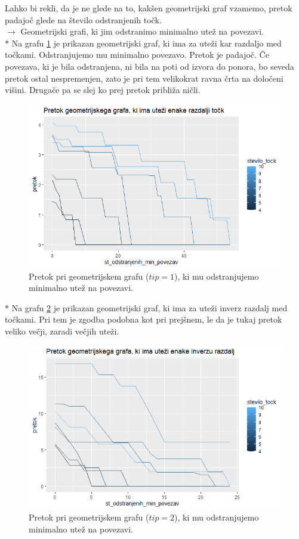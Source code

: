 \documentclass[a4paper]{article}
\begin{document}
Lahko bi rekli, da je ne glede na to, kakšen geometrijski graf vzamemo, pretok padajoč glede na število odstranjenih točk. \\

$\rightarrow $  Geometrijski grafi, ki jim odstranimo minimalno utež na povezavi. \\

$\ast$ Na grafu \ref{fig9} je prikazan geometrijski graf, ki ima za uteži kar razdaljo med točkami. Odstranjujemo mu minimalno povezavo. Pretok je padajoč. Če povezava, ki je bila odstranjena, ni bila na poti od izvora do ponora, bo seveda pretok ostal nespremenjen, zato je pri tem velikokrat ravna črta na določeni višini. Drugače pa se slej ko prej pretok približa ničli. 
\begin{figure}[H]
\centerline{\includegraphics[scale=.5]{p8.PNG}}
\caption{Pretok pri geometrijskem grafu ($tip = 1$), ki mu odstranjujemo minimalno utež na povezavi.}
\label{fig9}
\end{figure}

$\ast$ Na grafu \ref{fig10} je prikazan geometrijski graf, ki ima za uteži inverz razdalj med točkami. Pri tem je zgodba podobna kot pri prejšnem, le da je tukaj pretok veliko večji, zaradi večjih uteži.
\begin{figure}[H]
\centerline{\includegraphics[scale=.5]{p7.PNG}}
\caption{Pretok pri geometrijskem grafu ($tip = 2$), ki mu odstranjujemo minimalno utež na povezavi.}
\label{fig10}
\end{figure}
\end{document}

